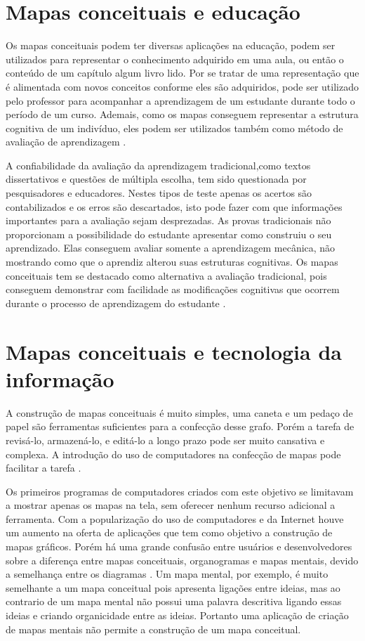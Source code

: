 \documentclass[
	12pt,				%
	openright,			%
	oneside,			%
	a4paper,			%
	english,			%
	french,				%
	spanish,			%
	brazil				%
	]{abntex2}
\begin{document}
\section{Mapas conceituais e educação}\label{sec-mapeduc}

Os mapas conceituais podem ter diversas aplicações na educação, podem ser utilizados para representar o conhecimento adquirido em uma aula, ou então o conteúdo de um capítulo algum livro lido. Por se tratar de uma representação que é alimentada com novos conceitos conforme eles são adquiridos, pode ser utilizado pelo professor para acompanhar a aprendizagem de um estudante durante todo o período de um curso. Ademais, como os mapas conseguem representar a estrutura cognitiva de um indivíduo, eles podem ser utilizados também como método de avaliação de aprendizagem \cite{Perin2014}.

A confiabilidade da avaliação da aprendizagem tradicional,como textos dissertativos e questões de múltipla escolha, tem sido questionada por pesquisadores e educadores. Nestes tipos de teste apenas os acertos são contabilizados e os erros são descartados, isto pode fazer com que informações importantes para a avaliação sejam desprezadas.
As provas tradicionais não proporcionam a possibilidade do estudante apresentar como construiu o seu aprendizado. Elas conseguem avaliar somente a aprendizagem mecânica, não mostrando como que o aprendiz alterou suas estruturas cognitivas.
Os mapas conceituais tem se destacado como alternativa a avaliação tradicional, pois conseguem demonstrar com facilidade as modificações cognitivas que ocorrem durante o processo de aprendizagem do estudante \cite{Dutra2002}.

\section{Mapas conceituais e tecnologia da informação}

A construção de mapas conceituais é muito simples, uma caneta e um pedaço de papel são ferramentas suficientes para a confecção desse grafo. Porém a tarefa de revisá-lo, armazená-lo, e editá-lo a longo prazo  pode ser muito cansativa e complexa. A introdução do uso de computadores na confecção de mapas pode facilitar a tarefa \cite{Novak2006}.

Os primeiros programas de computadores criados com este objetivo se limitavam a mostrar apenas os mapas na tela, sem oferecer nenhum recurso adicional a ferramenta. Com a popularização do uso de computadores e da Internet houve um aumento na oferta de aplicações que tem como objetivo a construção de mapas gráficos. Porém há uma grande confusão entre usuários e desenvolvedores sobre a diferença entre mapas conceituais, organogramas e mapas mentais, devido a semelhança entre os diagramas \cite{Perin2014}. Um mapa mental, por exemplo, é muito semelhante a um mapa conceitual pois apresenta ligações entre ideias, mas ao contrario de um mapa mental não possui uma palavra descritiva ligando essas ideias e criando organicidade entre as ideias. Portanto uma aplicação de criação de mapas mentais não permite a construção de um mapa conceitual. 
\end{document}
